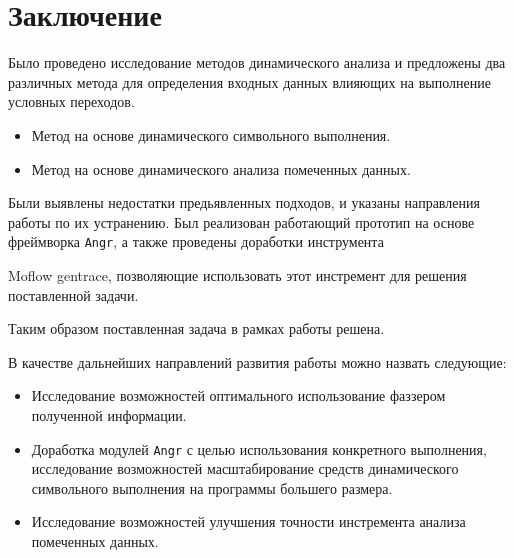 \bigskip
\chapter*{Заключение}

Было проведено исследование методов динамического анализа и предложены два различных метода для определения входных данных влияющих на выполнение условных переходов.

\begin{itemize}
    \item Метод на основе динамического символьного выполнения.
    \item Метод на основе динамического анализа помеченных данных.
\end{itemize}

Были выявлены недостатки предьявленных подходов, и указаны направления работы по их устранению. Был реализован работающий прототип на основе фреймворка \texttt{Angr}, а также проведены доработки инструмента \item{Moflow gentrace}, позволяющие использовать этот инстремент для решения поставленной задачи.

Таким образом поставленная задача в рамках работы решена.

В качестве дальнейших направлений развития работы можно назвать следующие:

\begin{itemize}
    \item Исследование возможностей оптимального использование фаззером полученной информации.
    \item Доработка модулей \texttt{Angr} с целью использования конкретного выполнения, исследование возможностей масштабирование средств динамического символьного выполнения на программы большего размера.
    \item Исследование возможностей улучшения точности инстремента анализа помеченных данных.
\end{itemize}





